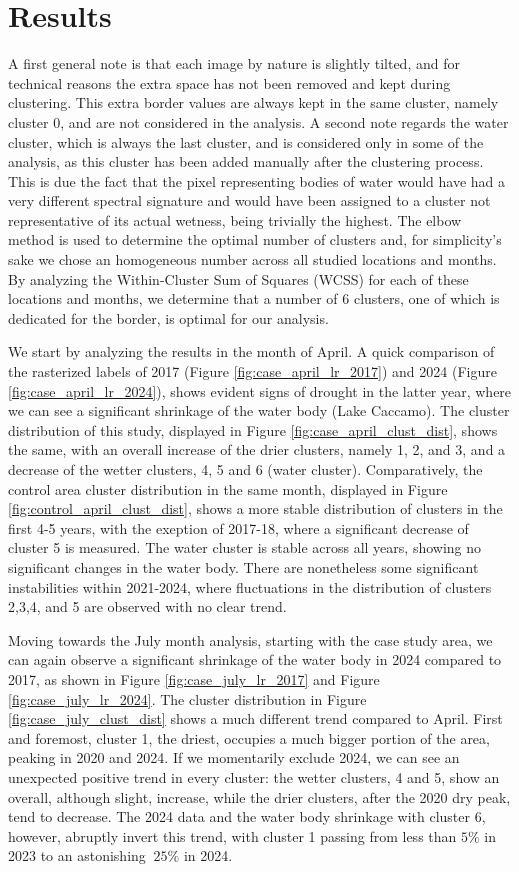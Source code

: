 \documentclass[10pt,twocolumn]{article}
\begin{document}
\section{Results}
A first general note is that each image by nature is slightly tilted, and for technical reasons the extra space has not been removed and kept during clustering. This extra border values are always kept in the same cluster, namely cluster 0, and are not considered in the analysis.
A second note regards the water cluster, which is always the last cluster, and is considered only in some of the analysis, as this cluster has been added manually after the clustering process. This is due the fact that the pixel representing bodies of water would have had a very different spectral signature and would have been assigned to a cluster not representative of its actual wetness, being trivially the highest.
The elbow method is used to determine the optimal number of clusters and, for simplicity's sake we chose an homogeneous number across all studied locations and months. By analyzing the Within-Cluster Sum of Squares (WCSS) for each of these locations and months, we determine that a number of 6 clusters, one of which is dedicated for the border, is optimal for our analysis.

We start by analyzing the results in the month of April. A quick comparison of the rasterized labels of 2017 (Figure \ref{fig:case_april_lr_2017}) and 2024 (Figure \ref{fig:case_april_lr_2024}), shows evident signs of drought in the latter year, where we can see a significant shrinkage of the water body (Lake Caccamo). The cluster distribution of this study, displayed in Figure \ref{fig:case_april_clust_dist}, shows the same, with an overall increase of the drier clusters, namely 1, 2, and 3, and a decrease of the wetter clusters, 4, 5 and 6 (water cluster). Comparatively, the control area cluster distribution in the same month, displayed in Figure \ref{fig:control_april_clust_dist}, shows a more stable distribution of clusters in the first 4-5 years, with the exeption of 2017-18, where a significant decrease of cluster 5 is measured. The water cluster is stable across all years, showing no significant changes in the water body. There are nonetheless some significant instabilities within 2021-2024, where fluctuations in the distribution of clusters 2,3,4, and 5 are observed with no clear trend. 


Moving towards the July month analysis, starting with the case study area, we can again observe a significant shrinkage of the water body in 2024 compared to 2017, as shown in Figure \ref{fig:case_july_lr_2017} and Figure \ref{fig:case_july_lr_2024}. The cluster distribution in Figure \ref{fig:case_july_clust_dist} shows a much different trend compared to April. First and foremost, cluster 1, the driest, occupies a much bigger portion of the area, peaking in 2020 and 2024. If we momentarily exclude 2024, we can see an unexpected positive trend in every cluster: the wetter clusters, 4 and 5, show an overall, although slight, increase, while the drier clusters, after the 2020 dry peak, tend to decrease. The 2024 data and the water body shrinkage with cluster 6, however, abruptly invert this trend, with cluster 1 passing from less than $5\%$ in 2023 to an astonishing $~25\%$ in 2024. 
\end{document}
